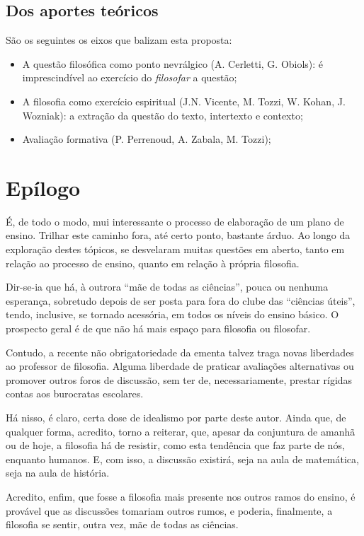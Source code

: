 \documentclass[12pt,a4paper]{article}
\begin{document}
	\subsection{Dos aportes teóricos}

	São os seguintes os eixos que balizam esta proposta: 
	
	\begin{itemize}
		\item A questão filosófica como ponto nevrálgico (A. Cerletti, 
		G. Obiols): é imprescindível ao exercício do \emph{filosofar} 
		a questão; 
		\item A filosofia como exercício espiritual (J.N. Vicente, 
		M. Tozzi, W. Kohan, J. Wozniak): a extração da questão do 
		texto, intertexto e contexto; 
		\item Avaliação formativa (P. Perrenoud, A. Zabala, M. Tozzi); 
	\end{itemize}

	\newpage

	\section{Epílogo}
	
	É, de todo o modo, mui interessante o processo de elaboração de um 
	plano de ensino. Trilhar este caminho fora, até certo ponto, bastante 
	árduo. Ao longo da exploração destes tópicos, se desvelaram muitas 
	questões em aberto, tanto em relação ao processo de ensino, quanto em 
	relação à própria filosofia. 

	Dir-se-ia que há, à outrora “mãe de todas as ciências”, pouca ou 
	nenhuma esperança, sobretudo depois de ser posta para fora do clube 
	das “ciências úteis”, tendo, inclusive, se tornado acessória, em todos 
	os níveis do ensino básico. O prospecto geral é de que não há mais 
	espaço para filosofia ou filosofar. 

	Contudo, a recente não obrigatoriedade da ementa talvez traga novas 
	liberdades ao professor de filosofia. Alguma liberdade de praticar 
	avaliações alternativas ou promover outros foros de discussão, sem 
	ter de, necessariamente, prestar rígidas contas aos burocratas 
	escolares. 

	Há nisso, é claro, certa dose de idealismo por parte deste autor. 
	Ainda que, de qualquer forma, acredito, torno a reiterar, que, apesar 
	da conjuntura de amanhã ou de hoje, a filosofia há de resistir, como 
	esta tendência que faz parte de nós, enquanto humanos. E, com isso, 
	a discussão existirá, seja na aula de matemática, seja na aula de 
	história. 

	Acredito, enfim, que fosse a filosofia mais presente nos outros ramos 
	do ensino, é provável que as discussões tomariam outros rumos, e 
	poderia, finalmente, a filosofia se sentir, outra vez, mãe de todas 
	as ciências. 
	
	\newpage

	
		
		
\end{document}

